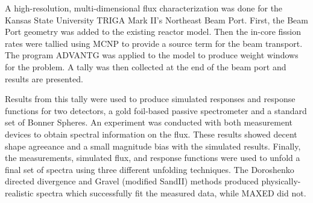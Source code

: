 
\pagestyle{empty}
\setlength{\baselineskip}{0.8cm}



A high-resolution, multi-dimensional flux characterization was done for the Kansas State University TRIGA Mark II's Northeast Beam Port.
First, the Beam Port geometry was added to the existing reactor model.
Then the in-core fission rates were tallied using MCNP to provide a source term for the beam transport.
The program ADVANTG was applied to the model to produce weight windows for the problem.
A tally was then collected at the end of the beam port and results are presented.

Results from this tally were used to produce simulated responses and response functions for two detectors, a gold foil-based passive spectrometer and a standard set of Bonner Spheres.
An experiment was conducted with both measurement devices to obtain spectral information on the flux.
These results showed decent shape agreeance and a small magnitude bias with the simulated results.
Finally, the measurements, simulated flux, and response functions were used to unfold a final set of spectra using three different unfolding techniques.
The Doroshenko directed divergence and Gravel (modified SandII) methods produced physically-realistic spectra which successfully fit the measured data, while MAXED did not.


